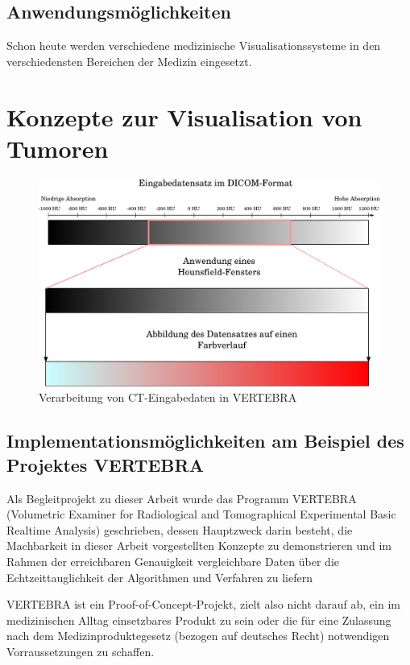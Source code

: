 \documentclass[a4paper,titlepage,12pt]{scrartcl}
\begin{document}
\subsection{Anwendungsmöglichkeiten}\label{ssec:applications}
Schon heute werden verschiedene medizinische Visualisationssysteme in den verschiedensten Bereichen der Medizin eingesetzt. 
\section{Konzepte zur Visualisation von Tumoren}\label{ssec:concepts}
\begin{figure}[p]
\begin{center}
\includegraphics[width=\textwidth]{graphics/Tonemapping.pdf}
\caption{Verarbeitung von CT-Eingabedaten in VERTEBRA}
\label{gradientmapping-graphic}
\end{center}
\end{figure}
\subsection{Implementationsmöglichkeiten am Beispiel des Projektes VERTEBRA}\label{ssec:implementations}
Als Begleitprojekt zu dieser Arbeit wurde das Programm VERTEBRA (Volumetric Examiner for Radiological and Tomographical Experimental Basic Realtime Analysis) geschrieben, dessen Hauptzweck darin besteht, die Machbarkeit in dieser Arbeit vorgestellten Konzepte zu demonstrieren und im Rahmen der erreichbaren Genauigkeit vergleichbare Daten über die Echtzeittauglichkeit der Algorithmen und Verfahren zu liefern

VERTEBRA ist ein Proof-of-Concept-Projekt, zielt also nicht darauf ab, ein im medizinischen Alltag einsetzbares Produkt zu sein oder die für eine Zulassung nach dem Medizinproduktegesetz (bezogen auf deutsches Recht) notwendigen Vorraussetzungen zu schaffen.
\end{document}
